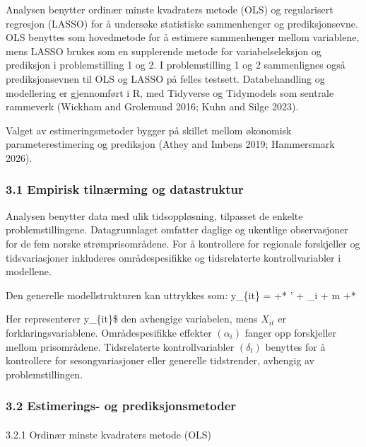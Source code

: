 \documentclass[
  letterpaper,
  DIV=11,
  numbers=noendperiod]{scrartcl}
\makeatletter
\let\oldparagraph\paragraph
\renewcommand{\paragraph}{
    \@ifstar
      \xxxParagraphStar
      \xxxParagraphNoStar
  }
\newcommand{\xxxParagraphStar}[1]{\oldparagraph*{#1}\mbox{}}
\newcommand{\xxxParagraphNoStar}[1]{\oldparagraph{#1}\mbox{}}
\makeatother
\begin{document}
Analysen benytter ordinær minste kvadraters metode (OLS) og regularisert
regresjon (LASSO) for å undersøke statistiske sammenhenger og
prediksjonsevne. OLS benyttes som hovedmetode for å estimere
sammenhenger mellom variablene, mens LASSO brukes som en supplerende
metode for variabelseleksjon og prediksjon i problemstilling 1 og 2. I
problemstilling 1 og 2 sammenlignes også prediksjonsevnen til OLS og
LASSO på felles testsett. Databehandling og modellering er gjennomført i
R, med Tidyverse og Tidymodels som sentrale rammeverk (Wickham and
Grolemund 2016; Kuhn and Silge 2023).

Valget av estimeringsmetoder bygger på skillet mellom økonomisk
parameterestimering og prediksjon (Athey and Imbens 2019; Hammersmark
2026).

\subsubsection{3.1 Empirisk tilnærming og
datastruktur}\label{empirisk-tilnuxe6rming-og-datastruktur}

Analysen benytter data med ulik tidsoppløsning, tilpasset de enkelte
problemstillingene. Datagrunnlaget omfatter daglige og ukentlige
observasjoner for de fem norske strømprisområdene. For å kontrollere for
regionale forskjeller og tidsvariasjoner inkluderes områdespesifikke og
tidsrelaterte kontrollvariabler i modellene.

Den generelle modellstrukturen kan uttrykkes som: y\_\{it\} =  +*
\boldsymbol{\beta}' + \alpha\_i + \delta*m +*

Her representerer y\_\{it\}\$ den avhengige variabelen, mens \(X_{it}\)
er forklaringsvariablene. Områdespesifikke effekter \((\alpha_i)\)
fanger opp forskjeller mellom prisområdene. Tidsrelaterte
kontrollvariabler \((\delta_t)\) benyttes for å kontrollere for
sesongvariasjoner eller generelle tidstrender, avhengig av
problemstillingen.

\subsubsection{3.2 Estimerings- og
prediksjonsmetoder}\label{estimerings--og-prediksjonsmetoder}

\paragraph{3.2.1 Ordinær minste kvadraters metode
(OLS)}\label{ordinuxe6r-minste-kvadraters-metode-ols}
\end{document}
